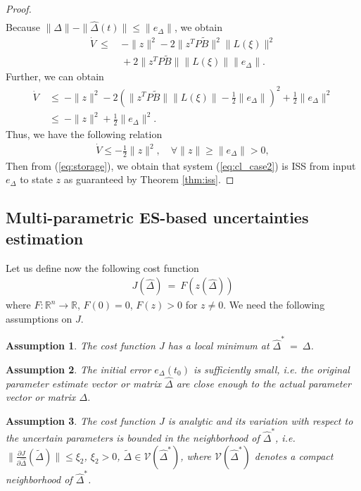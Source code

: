 \documentclass[twoside,leqno,onecolumn]{article}
\newtheorem{assumption}{Assumption}
\begin{document}
\begin{proof}
\begin{align*}
\end{align*}
Because $\|\Delta\|-\|\widehat{\Delta }(t)\|\leq\|e_\Delta\|$, we obtain
\begin{align*}
\dot{V}
~\leq&~-\|z\|^2-2\|z^T P \tilde B\|^2\|L(\xi)\|^2\\
&~+ 2 \|z^T P \tilde B\| \|L(\xi)\|\|e_\Delta\|.
\end{align*}
Further, we can obtain
\begin{align*}
\dot{V}&~\leq~-\|z\|^2 -2(\|z^T P \tilde B\|\|L(\xi)\|-\frac{1}{2}\|e_\Delta \|)^2 + \frac{1}{2}\|e_\Delta\|^2\\
&~\leq~-\|z\|^2+ \frac{1}{2}\|e_\Delta\|^2.
\end{align*}
Thus, we have the following relation
\begin{align*}
\dot{V}\leq-\frac{1}{2}\|z\|^2,\quad \forall \|z\|\geq \|e_\Delta\|>0,
\end{align*}
Then from (\ref{eq:storage}), we obtain that system (\ref{eq:cl_case2}) is ISS from input $e_\Delta$ to state $z$ as guaranteed by Theorem \ref{thm:iss}.
\end{proof}




\subsection{Multi-parametric ES-based uncertainties estimation}
\label{sec:ES}
Let us define now the following cost function
\begin{align}
\label{eq:cost_gen}
J(\widehat{\Delta}) ~=~ F(z(\widehat{\Delta}))
\end{align}
where $F : \mathbb{R}^{n} \rightarrow \mathbb{R}$, $F(0) = 0$, $F(z)>0$ for $z\neq0$. We need the following assumptions on $J$.

\begin{assumption}
\label{asp:cost}
The cost function $J$ has a local minimum at $\widehat{\Delta}^* ~=~\Delta$.
\end{assumption}

\begin{assumption}
\label{asp:local}
The initial error $e_\Delta(t_0)$ is sufficiently small, i.e. the original parameter estimate vector or matrix $\widehat{\Delta}$ are close enough to the actual parameter vector or matrix $\Delta$.
\end{assumption}

\begin{assumption}
\label{asp:Lips}
The cost function $J$ is analytic and its variation with respect to the uncertain parameters is bounded in the neighborhood of $\widehat{\Delta}^*$, i.e. $\|\frac{\partial J}{\partial \widehat{\Delta}}(\tilde \Delta)\|\leq \xi_2$, $\xi_2>0$,
$\tilde{\Delta}\in\mathcal{V}(\widehat{\Delta}^*)$, where $\mathcal{V}(\widehat{\Delta}^*)$ denotes a compact neighborhood of $\widehat{\Delta}^*$.
\end{assumption}
\end{document}
